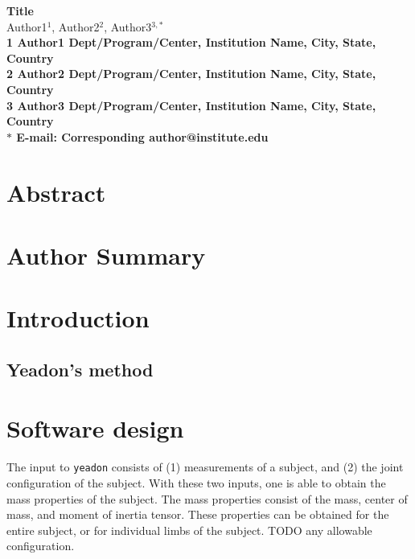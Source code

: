 \documentclass[10pt]{article}
\date{}
\begin{document}
\begin{flushleft}
{\Large
\textbf{Title}
}
\\
Author1$^{1}$, 
Author2$^{2}$, 
Author3$^{3,\ast}$
\\
\bf{1} Author1 Dept/Program/Center, Institution Name, City, State, Country
\\
\bf{2} Author2 Dept/Program/Center, Institution Name, City, State, Country
\\
\bf{3} Author3 Dept/Program/Center, Institution Name, City, State, Country
\\
$\ast$ E-mail: Corresponding author@institute.edu
\end{flushleft}

\section*{Abstract}

\section*{Author Summary}

\section*{Introduction}

\subsection*{Yeadon's method}


\section*{Software design}

The input to \verb+yeadon+ consists of (1) measurements of a subject, and (2)
the joint configuration of the subject. With these two inputs, one is able to
obtain the mass properties of the subject.
The mass properties consist of the mass, center of mass, and moment of inertia
tensor. These properties can be obtained for the entire subject, or for
individual limbs of the subject. TODO any allowable configuration.
\end{document}
